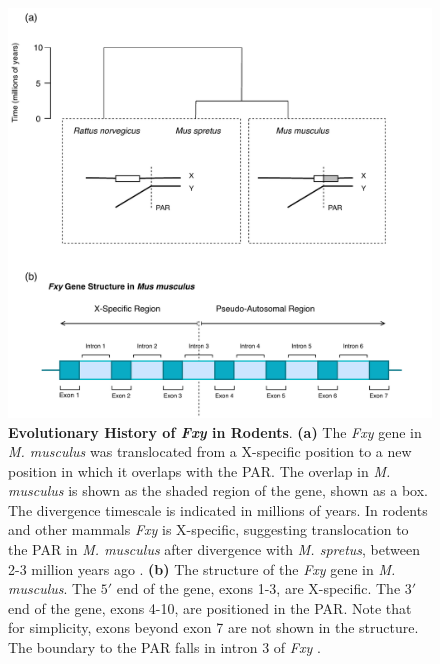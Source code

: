 \begin{figure}[htbp]
\centering
\includegraphics[width=\textwidth]{figures/diagrams/Fxy.pdf}
\caption[Evolutionary History of \textit{Fxy} in Rodents]{\textbf{Evolutionary History of \textit{Fxy} in Rodents}. \textbf{(a)} The \textit{Fxy} gene in \textit{M. musculus} was translocated from a X-specific position to a new position in which it overlaps with the PAR. The overlap in \textit{M. musculus} is shown as the shaded region of the gene, shown as a box. The divergence timescale is indicated in millions of years. In rodents and other mammals \textit{Fxy} is X-specific, suggesting translocation to the PAR in \textit{M. musculus} after divergence with \textit{M. spretus}, between 2-3 million years ago \citep[adapted from Figure 1][]{Galtier2007AdaptationEvolution}. \textbf{(b)} The structure of the \textit{Fxy} gene in \textit{M. musculus}. The $5'$ end of the gene, exons 1-3, are X-specific. The $3'$ end of the gene, exons 4-10, are positioned in the PAR. Note that for simplicity, exons beyond exon 7 are not shown in the structure. The boundary to the PAR falls in intron 3 of \textit{Fxy} \citep{Palmer1997AMice}. }
\label{fig:Fxy}
\end{figure}